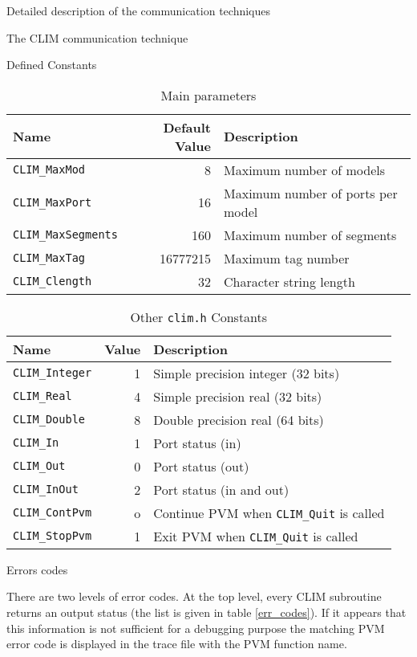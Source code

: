 \begin{section}{Detailed description of the communication techniques}
\begin{subsection}{The CLIM communication technique}
\begin{subsubsection}{Defined Constants}
\begin{table}[hbtp]
\begin{center}
\begin{tabular}{|lrl|}
\hline
  Name & Default Value & Description \\
\hline
\hline
  {\tt CLIM\_MaxMod}     &  8 & Maximum number of models\\
  {\tt CLIM\_MaxPort}    & 16 & Maximum number of ports per model\\
  {\tt CLIM\_MaxSegments} & 160 & Maximum number of segments\\
  {\tt CLIM\_MaxTag}     & 16777215 & Maximum tag number\\
  {\tt CLIM\_Clength}    & 32 & Character string length\\
\hline
\end{tabular}
\end{center}
\caption{Main parameters}
\label{def_dims}
\end{table}
%
\begin{table}[hbtp]
\begin{center}
\begin{tabular}{|lrl|}
\hline
  Name & Value & Description \\
\hline
\hline
  {\tt CLIM\_Integer}    & 1 & Simple precision integer (32 bits)\\
  {\tt CLIM\_Real}       & 4 & Simple precision real (32 bits)\\
  {\tt CLIM\_Double}     & 8 & Double precision real (64 bits)\\
  {\tt CLIM\_In}         & 1 & Port status (in)\\
  {\tt CLIM\_Out}        & 0 & Port status (out)\\
  {\tt CLIM\_InOut}      & 2 & Port status (in and out)\\
  {\tt CLIM\_ContPvm}    & o & Continue PVM when {\tt CLIM\_Quit} is called\\
  {\tt CLIM\_StopPvm}    & 1 & Exit PVM when {\tt CLIM\_Quit} is called\\
\hline
\end{tabular}
\end{center}
\caption{Other {\tt clim.h} Constants}
\label{def_data}
\end{table}
\end{subsubsection}
%
\begin{subsubsection}{Errors codes}

There are two levels of error codes. At the top level, every CLIM
subroutine returns an output status (the list is given in table 
\ref{err_codes}). If it appears that this information is not sufficient
for a debugging purpose the matching PVM error code is displayed in the
trace file with the PVM function name.


\end{subsubsection}
\end{subsection}
\end{section}
